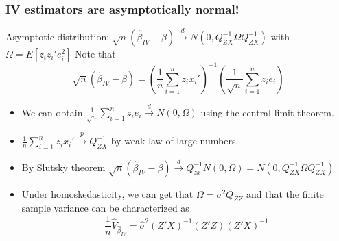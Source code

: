\documentclass[aspectratio=169]{beamer}
\begin{document}
\begin{frame}
\frametitle{IV estimators are asymptotically normal!}
\begin{block}{Asymptotic distribution: $\sqrt{n}(\hat{\beta}_{IV}-\beta)\xrightarrow{d}N(0,Q_{ZX}^{-1}\Omega Q_{ZX}^{-1})$ with  $\Omega=E[z_iz_i'e_i^2]$ }
Note that 
\[
\sqrt{n}(\hat{\beta}_{IV}-\beta) = \left(\frac{1}{n} \sum_{i=1}^n z_ix_i'\right)^{-1}\left(\frac{1}{\sqrt{n}}\sum_{i=1}^nz_ie_i\right)
\]
\begin{itemize}
\item We can obtain $\frac{1}{\sqrt{n}}\sum_{i=1}^nz_ie_i\xrightarrow{d}N(0,\Omega)$ using the central limit theorem. 
\item $\frac{1}{n} \sum_{i=1}^n z_ix_i'\xrightarrow{p}Q_{ZX}^{-1}$ by weak law of large numbers. 
\item By Slutsky theorem $\sqrt{n}(\hat{\beta}_{IV}-\beta) \xrightarrow{d}Q_{zx}^{-1}N(0,\Omega)=N(0,Q_{ZX}^{-1}\Omega Q_{ZX}^{-1}) $
\item Under homoskedasticity, we can get that $\Omega= \sigma^2Q_{ZZ}$ and that the finite sample variance can be characterized as 
\[
\frac{1}{n}\widehat{V}_{\hat{\beta}_{IV}}=\hat{\sigma}^2(Z'X)^{-1}(Z'Z)(Z'X)^{-1}
\]
\end{itemize}
\end{block}
\end{frame}
\end{document}
